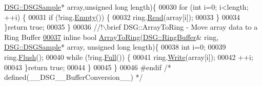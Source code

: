 \begin{DoxyCode}
      \hyperlink{namespace_d_s_g_ac39a94cd27ebcd9c1e7502d0c624894a}{DSG::DSGSample}* array,\textcolor{keywordtype}{unsigned} \textcolor{keywordtype}{long} length)\{
00030         \textcolor{keywordflow}{for} (\textcolor{keywordtype}{int} i=0; i<length; ++i) \{
00031             \textcolor{keywordflow}{if} (!ring.\hyperlink{class_d_s_g_1_1_ring_buffer_ac1346f5842d08b988a5297abe4089b96}{Empty}()) \{
00032                 ring.\hyperlink{class_d_s_g_1_1_ring_buffer_a6b2848a64f15c7b0c320779582fa0fbe}{Read}(array[i]);
00033             \}
00034         \}\textcolor{keywordflow}{return} \textcolor{keyword}{true};
00035     \}\textcolor{comment}{}
00036 \textcolor{comment}{    //!\(\backslash\)brief DSG::ArrayToRing - Move array data to a Ring Buffer}
\hypertarget{_buffer_conversion_8h_source_l00037}{}\hyperlink{namespace_d_s_g_a608643638b3a678c17b14c406d7edc85}{00037} \textcolor{comment}{}    \textcolor{keyword}{inline} \textcolor{keywordtype}{bool} \hyperlink{namespace_d_s_g_a608643638b3a678c17b14c406d7edc85}{ArrayToRing}(\hyperlink{class_d_s_g_1_1_ring_buffer}{DSG::RingBuffer}& ring,
      \hyperlink{namespace_d_s_g_ac39a94cd27ebcd9c1e7502d0c624894a}{DSG::DSGSample}* array, \textcolor{keywordtype}{unsigned} \textcolor{keywordtype}{long} length)\{
00038         \textcolor{keywordtype}{int} i=0;
00039         ring.\hyperlink{class_d_s_g_1_1_ring_buffer_ab23c8003d2857809a816068eeb209d60}{Flush}();
00040         \textcolor{keywordflow}{while} (!ring.\hyperlink{class_d_s_g_1_1_ring_buffer_a53ddb04ffcbb5470a8d2b0a3c65b70cb}{Full}()) \{
00041             ring.\hyperlink{class_d_s_g_1_1_ring_buffer_aa5dd2caa0a270173251faee40a43d692}{Write}(array[i]);
00042             ++i;
00043         \}\textcolor{keywordflow}{return} \textcolor{keyword}{true};
00044     \}
00045 \}
00046 \textcolor{preprocessor}{#endif }\textcolor{comment}{/* defined(\_\_DSG\_\_BufferConversion\_\_) */}\textcolor{preprocessor}{}
\end{DoxyCode}
